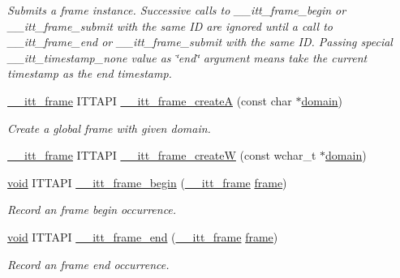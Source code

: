 \begin{DoxyCompactItemize}
\begin{DoxyCompactList}\small\item\em Submits a frame instance. Successive calls to \-\_\-\-\_\-itt\-\_\-frame\-\_\-begin or \-\_\-\-\_\-itt\-\_\-frame\-\_\-submit with the same I\-D are ignored until a call to \-\_\-\-\_\-itt\-\_\-frame\-\_\-end or \-\_\-\-\_\-itt\-\_\-frame\-\_\-submit with the same I\-D. Passing special \-\_\-\-\_\-itt\-\_\-timestamp\-\_\-none value as \char`\"{}end\char`\"{} argument means take the current timestamp as the end timestamp. \end{DoxyCompactList}\item 
\hyperlink{group__frames_gad1b74516ce88dc28bff032244625c7c2}{\-\_\-\-\_\-itt\-\_\-frame} I\-T\-T\-A\-P\-I \hyperlink{group__frames_ga8b106f002c9f1ed6e17d5833e8200ff0}{\-\_\-\-\_\-itt\-\_\-frame\-\_\-create\-A} (const char $\ast$\hyperlink{ittnotify__static_8h_ae4bc3459cfd348603d57d87ede15591b}{domain})
\begin{DoxyCompactList}\small\item\em Create a global frame with given domain. \end{DoxyCompactList}\item 
\hyperlink{group__frames_gad1b74516ce88dc28bff032244625c7c2}{\-\_\-\-\_\-itt\-\_\-frame} I\-T\-T\-A\-P\-I \hyperlink{group__frames_gafced67ce3fdb934507bafaedca2c4ed4}{\-\_\-\-\_\-itt\-\_\-frame\-\_\-create\-W} (const wchar\-\_\-t $\ast$\hyperlink{ittnotify__static_8h_ae4bc3459cfd348603d57d87ede15591b}{domain})
\item 
\hyperlink{ittnotify__static_8h_af941d56e55e3c5465135b60c4d6343ed}{void} I\-T\-T\-A\-P\-I \hyperlink{group__frames_ga270e37da31aa32c8e2fbd0b71247e774}{\-\_\-\-\_\-itt\-\_\-frame\-\_\-begin} (\hyperlink{group__frames_gad1b74516ce88dc28bff032244625c7c2}{\-\_\-\-\_\-itt\-\_\-frame} \hyperlink{ittnotify__static_8h_af16c2c7e1ae3ca168c49206b9609496b}{frame})
\begin{DoxyCompactList}\small\item\em Record an frame begin occurrence. \end{DoxyCompactList}\item 
\hyperlink{ittnotify__static_8h_af941d56e55e3c5465135b60c4d6343ed}{void} I\-T\-T\-A\-P\-I \hyperlink{group__frames_ga2f91556b78eae2fc509127af8db2aba5}{\-\_\-\-\_\-itt\-\_\-frame\-\_\-end} (\hyperlink{group__frames_gad1b74516ce88dc28bff032244625c7c2}{\-\_\-\-\_\-itt\-\_\-frame} \hyperlink{ittnotify__static_8h_af16c2c7e1ae3ca168c49206b9609496b}{frame})
\begin{DoxyCompactList}\small\item\em Record an frame end occurrence. \end{DoxyCompactList}\end{DoxyCompactItemize}


